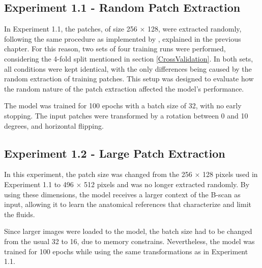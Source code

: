 \subsection{Experiment 1.1 - Random Patch Extraction}
In Experiment 1.1, the patches, of size 256 $\times$ 128, were extracted randomly, following the same procedure as implemented by \textcite{Tennakoon2018}, explained in the previous chapter. For this reason, two sets of four training runs were performed, considering the 4-fold split mentioned in section \ref{CrossValidation}. In both sets, all conditions were kept identical, with the only differences being caused by the random extraction of training patches. This setup was designed to evaluate how the random nature of the patch extraction affected the model's performance. 
\par
The model was trained for 100 epochs with a batch size of 32, with no early stopping. The input patches were transformed by a rotation between 0 and 10 degrees, and horizontal flipping. 

\subsection{Experiment 1.2 - Large Patch Extraction}
In this experiment, the patch size was changed from the 256 $\times$ 128 pixels used in Experiment 1.1 to 496 $\times$ 512 pixels and was no longer extracted randomly. By using these dimensions, the model receives a larger context of the B-scan as input, allowing it to learn the anatomical references that characterize and limit the fluids.
\par
Since larger images were loaded to the model, the batch size had to be changed from the usual 32 to 16, due to memory constrains. Nevertheless, the model was trained for 100 epochs while using the same transformations as in Experiment 1.1.

